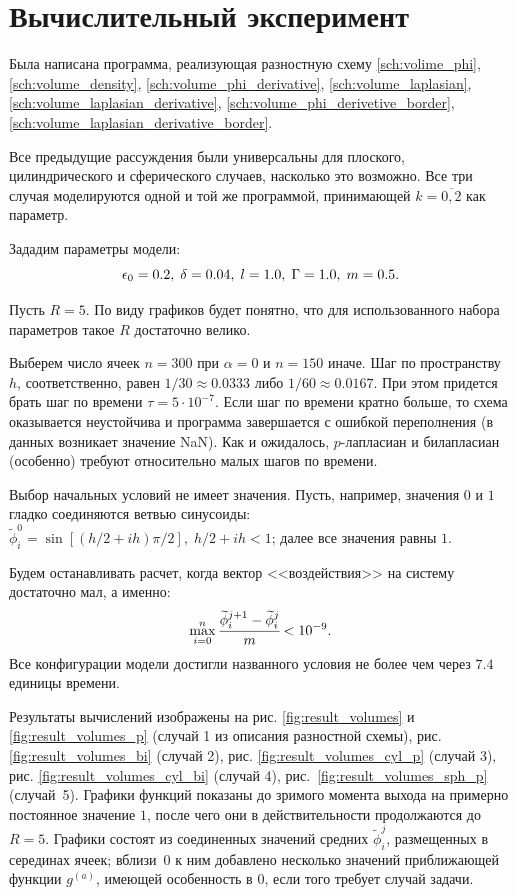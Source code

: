 
\section{Вычислительный эксперимент}

Была написана программа, реализующая разностную схему \eqref{sch:volime_phi}, \eqref{sch:volume_density}, \eqref{sch:volume_phi_derivative}, \eqref{sch:volume_laplasian}, \eqref{sch:volume_laplasian_derivative}, \eqref{sch:volume_phi_derivetive_border}, \eqref{sch:volume_laplasian_derivative_border}.

Все предыдущие рассуждения были универсальны для плоского, цилиндрического и сферического случаев, насколько это возможно. Все три случая моделируются одной и той же программой, принимающей $k = \overline{0, 2}$ как параметр.

Зададим параметры модели:
$$\epsilon_0 = 0.2, \; \delta = 0.04, \; l = 1.0, \; \Gamma = 1.0, \; m = 0.5 {\text{.}}$$

Пусть $R = 5$. По виду графиков будет понятно, что для использованного набора параметров такое $R$ достаточно велико.

Выберем число ячеек $n = 300$ при $\alpha = 0$ и $n = 150$ иначе. Шаг по пространству~$h$, соответственно, равен $1/30 \approx 0.0333$ либо $1/60 \approx 0.0167$. При этом придется брать шаг по времени $\tau = 5 \cdot 10^{-7}$. Если шаг по времени кратно больше, то схема оказывается неустойчива и программа завершается с ошибкой переполнения (в данных возникает значение NaN). Как и ожидалось, $p$-лапласиан и билапласиан (особенно) требуют относительно малых шагов по времени.

Выбор начальных условий не имеет значения. Пусть, например, значения $0$ и $1$ гладко соединяются ветвью синусоиды: $\widetilde{\phi}_i^0 = \sin[(h/2 + ih) \pi / 2], \; h/2 + ih < 1$; далее все значения равны $1$.

Будем останавливать расчет, когда вектор <<воздействия>> на систему достаточно мал, а именно:
$$\max\limits_{i = 0}^n \cfrac{\widetilde{\phi}_i^{j + 1} - \widetilde{\phi}_i^j}{m} < 10^{-9} {\text{.}}$$
Все конфигурации модели достигли названного условия не более чем через $7.4$ единицы времени.

Результаты вычислений изображены на рис. \ref{fig:result_volumes} и \ref{fig:result_volumes_p} (случай 1 из описания разностной схемы), рис. \ref{fig:result_volumes_bi} (случай 2), рис. \ref{fig:result_volumes_cyl_p} (случай 3), рис. \ref{fig:result_volumes_cyl_bi} (случай 4), рис.~\ref{fig:result_volumes_sph_p} (случай~5). Графики функций показаны до зримого момента выхода на примерно постоянное значение $1$, после чего они в действительности продолжаются до $R = 5$. Графики состоят из соединенных значений средних $\widetilde{\phi}_i^j$, размещенных в серединах ячеек; вблизи~$0$ к ним добавлено несколько значений приближающей функции $g^{(a)}$, имеющей особенность в $0$, если того требует случай задачи.

